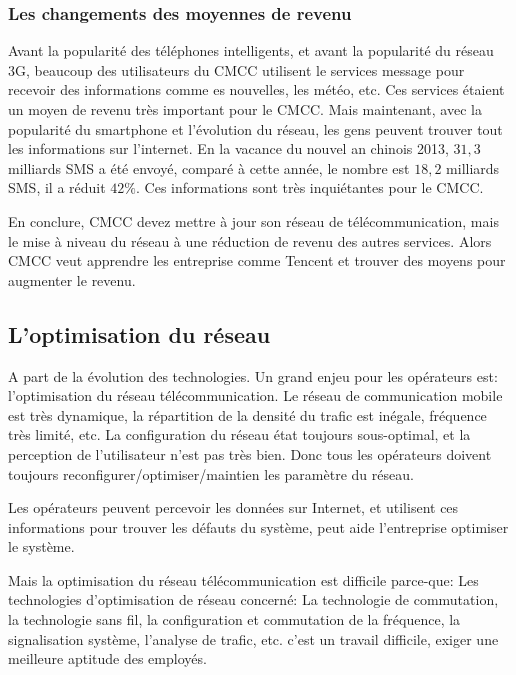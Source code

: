  \subsubsection{Les changements des moyennes de revenu}
Avant la popularité des téléphones intelligents, et avant la popularité du réseau 3G, beaucoup des utilisateurs du CMCC utilisent le services message pour recevoir des informations comme es nouvelles, les météo, etc. Ces services étaient un moyen de revenu très important pour le CMCC.  Mais maintenant, avec la popularité du smartphone et l'évolution du réseau, les gens peuvent trouver tout les informations sur l'internet. En la vacance du nouvel an chinois 2013, $31,3$ milliards SMS a été envoyé, comparé à cette année, le nombre est $18,2$ milliards SMS, il a réduit $42\%$. Ces informations sont très inquiétantes pour le CMCC.

En conclure, CMCC devez mettre à jour son réseau de télécommunication, mais le mise à niveau du réseau à une réduction de revenu des autres services. Alors CMCC veut apprendre les entreprise comme \textsf{Tencent} et trouver des moyens pour augmenter le revenu.
  \subsection{L'optimisation du réseau}
A part de la évolution des technologies. Un grand enjeu pour les opérateurs est: l'optimisation du réseau télécommunication. Le réseau de communication mobile est très dynamique, la répartition de la densité du trafic est inégale, fréquence très limité, etc. La configuration du réseau état toujours sous-optimal, et la perception de l'utilisateur n'est pas très bien. Donc tous les opérateurs doivent toujours reconfigurer/optimiser/maintien les paramètre du réseau.
  
Les opérateurs peuvent percevoir les données sur Internet, et utilisent ces informations pour trouver les défauts du système, peut aide l'entreprise optimiser le système.

Mais la optimisation du réseau télécommunication est difficile parce-que: Les technologies d'optimisation de réseau concerné: La technologie de commutation, la technologie sans fil, la configuration et commutation de la fréquence, la signalisation système, l'analyse de trafic, etc. c'est un travail difficile, exiger une meilleure aptitude des employés.  

